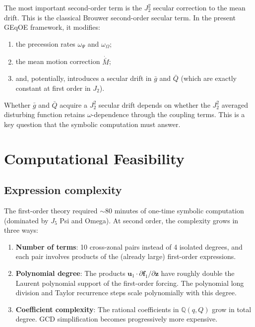 \documentclass[11pt]{article}
\begin{document}
The most important second-order term is the $J_2^2$ secular correction to
the mean drift. This is the classical Brouwer second-order secular term. In
the present GEqOE framework, it modifies:
\begin{enumerate}
\item the precession rates $\omega_{\Psi}$ and $\omega_{\Omega}$;
\item the mean motion correction $\dot{\bar M}$;
\item and, potentially, introduces a secular drift in $\bar g$ and $\bar Q$
(which are exactly constant at first order in $J_2$).
\end{enumerate}

Whether $\bar g$ and $\bar Q$ acquire a $J_2^2$ secular drift depends on
whether the $J_2^2$ averaged disturbing function retains $\omega$-dependence
through the coupling terms. This is a key question that the symbolic
computation must answer.


\section{Computational Feasibility}

\subsection{Expression complexity}

The first-order theory required $\sim$80 minutes of one-time symbolic
computation (dominated by $J_5$ Psi and Omega). At second order, the
complexity grows in three ways:

\begin{enumerate}
\item \textbf{Number of terms}: 10 cross-zonal pairs instead of 4 isolated
degrees, and each pair involves products of the (already large) first-order
expressions.

\item \textbf{Polynomial degree}: The products $\bm u_1 \cdot
\partial \bm f_1/\partial \bm z$ have roughly double the Laurent polynomial
support of the first-order forcing. The polynomial long division and
Taylor recurrence steps scale polynomially with this degree.

\item \textbf{Coefficient complexity}: The rational coefficients in
$\mathbb{Q}(q, Q)$ grow in total degree. GCD simplification becomes
progressively more expensive.
\end{enumerate}
\end{document}
